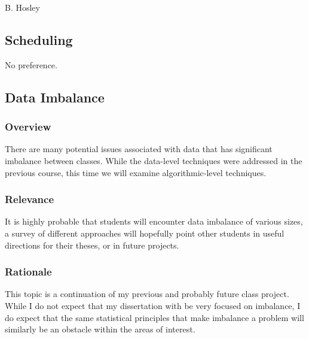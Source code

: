 \documentclass[12pt]{amsart}
\begin{document}
\raggedbottom

\hspace{\fill} {\large B. Hosley}
\bigskip


\setcounter{subsection}{-1}
\subsection{Scheduling}

No preference. \\

\subsection{Data Imbalance}

\subsubsection{Overview}
There are many potential issues associated with data that has significant imbalance between classes. 
While the data-level techniques were addressed in the previous course, 
this time we will examine algorithmic-level techniques.

\subsubsection{Relevance}
It is highly probable that students will encounter data imbalance of various sizes,
a survey of different approaches will hopefully point other students in useful directions
for their theses, or in future projects.

\subsubsection{Rationale}
This topic is a continuation of my previous and probably future class project.
While I do not expect that my dissertation with be very focused on imbalance, 
I do expect that the same statistical principles that make imbalance a problem
will similarly be an obstacle within the areas of interest.
\end{document}
